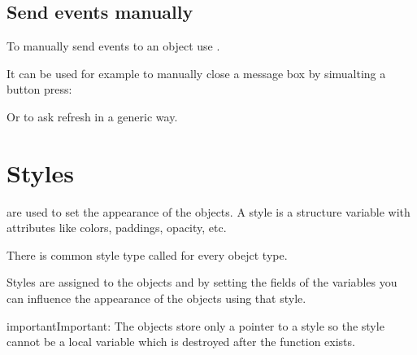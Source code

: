 \documentclass[letterpaper,10pt,english]{sphinxmanual}
\begin{document}
\subsection{Send events manually}
\label{\detokenize{overview/events:send-events-manually}}
To manually send events to an object use .

It can be used for example to manually close a message box by simualting a button press:

\begin{sphinxVerbatim}[commandchars=\\\{\}]
   
  
\end{sphinxVerbatim}

Or to ask refresh in a generic way.

\begin{sphinxVerbatim}[commandchars=\\\{\}]
  
\end{sphinxVerbatim}


\section{Styles}
\label{\detokenize{overview/styles:styles}}\label{\detokenize{overview/styles::doc}}
 are used to set the appearance of the objects. A style is a structure variable with attributes like colors, paddings, opacity, etc.

There is common style type called  for every obejct type.

Styles are assigned to the objects and by setting the fields of the  variables you can influence the appearance of the objects using that style.

\begin{sphinxadmonition}{important}{Important:}
The objects store only a pointer to a style so the style cannot be a local variable which is destroyed after the function exists. 
\end{sphinxadmonition}
\end{document}
